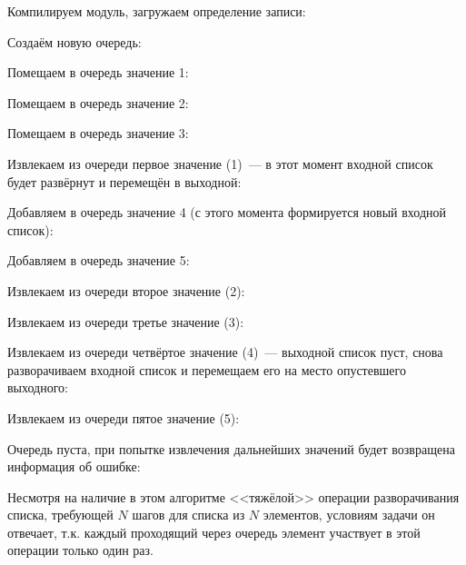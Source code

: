 \documentclass[
  paper=a4,
  fontsize=14pt,
  openany,
  appendixprefix=true
]{scrbook}
\begin{document}
Компилируем модуль, загружаем определение записи:

Создаём новую очередь:

Помещаем в очередь значение 1:

Помещаем в очередь значение 2:

Помещаем в очередь значение 3:

Извлекаем из очереди первое значение (1)~--- в этот момент входной список будет развёрнут и перемещён в выходной:

Добавляем в очередь значение 4 (с этого момента формируется новый входной список):

Добавляем в очередь значение 5:

Извлекаем из очереди второе значение (2):

Извлекаем из очереди третье значение (3):

Извлекаем из очереди четвёртое значение (4)~--- выходной список пуст, снова разворачиваем входной список и перемещаем его на место опустевшего выходного:

Извлекаем из очереди пятое значение (5):

Очередь пуста, при попытке извлечения дальнейших значений будет возвращена информация об ошибке:

Несмотря на наличие в этом алгоритме <<тяжёлой>> операции разворачивания списка, требующей $N$ шагов для списка из $N$ элементов, условиям задачи он отвечает, т.к. каждый проходящий через очередь элемент участвует в этой операции только один раз.
\end{document}

